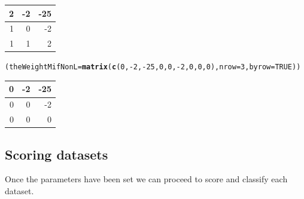 \documentclass[a4paper,10pt]{article}\usepackage[]{graphicx}\usepackage[]{xcolor}
\makeatletter
\newcommand{\hlnum}[1]{\textcolor[rgb]{0.686,0.059,0.569}{#1}}%
\newcommand{\hlopt}[1]{\textcolor[rgb]{0,0,0}{#1}}%
\newcommand{\hlstd}[1]{\textcolor[rgb]{0.345,0.345,0.345}{#1}}%
\newcommand{\hlkwb}[1]{\textcolor[rgb]{0.69,0.353,0.396}{#1}}%
\newcommand{\hlkwc}[1]{\textcolor[rgb]{0.333,0.667,0.333}{#1}}%
\newcommand{\hlkwd}[1]{\textcolor[rgb]{0.737,0.353,0.396}{\textbf{#1}}}%
\newenvironment{kframe}{%
 \def\at@end@of@kframe{}%
 \ifinner\ifhmode%
  \def\at@end@of@kframe{\end{minipage}}%
  \begin{minipage}{\columnwidth}%
 \fi\fi%
 \def\FrameCommand##1{\hskip\@totalleftmargin \hskip-\fboxsep
 \colorbox{shadecolor}{##1}\hskip-\fboxsep
     \hskip-\linewidth \hskip-\@totalleftmargin \hskip\columnwidth}%
 \MakeFramed {\advance\hsize-\width
   \@totalleftmargin\z@ \linewidth\hsize
   \@setminipage}}%
 {\par\unskip\endMakeFramed%
 \at@end@of@kframe}
\newenvironment{knitrout}{}{} %
\makeatother
\begin{document}
\begin{knitrout}
\begin{tabular}{r|r|r}
\hline
2 & -2 & -25\\
\hline
1 & 0 & -2\\
\hline
1 & 1 & 2\\
\hline
\end{tabular}\begin{kframe}\begin{alltt}
\hlstd{(theWeightMifNonL}\hlkwb{=}\hlkwd{matrix} \hlstd{(}\hlkwd{c}\hlstd{(}\hlnum{0}\hlstd{,}\hlopt{-}\hlnum{2}\hlstd{,}\hlopt{-}\hlnum{25}\hlstd{,}\hlnum{0}\hlstd{,}\hlnum{0}\hlstd{,}\hlopt{-}\hlnum{2}\hlstd{,}\hlnum{0}\hlstd{,}\hlnum{0}\hlstd{,}\hlnum{0}\hlstd{),} \hlkwc{nrow}\hlstd{=}\hlnum{3}\hlstd{,} \hlkwc{byrow}\hlstd{=}\hlnum{TRUE}\hlstd{))}
\end{alltt}
\end{kframe}


\begin{tabular}{r|r|r}
\hline
0 & -2 & -25\\
\hline
0 & 0 & -2\\
\hline
0 & 0 & 0\\
\hline
\end{tabular}
\end{knitrout}


\subsection{Scoring datasets}

Once the parameters have been set we can proceed to score and classify each dataset.
\end{document}
